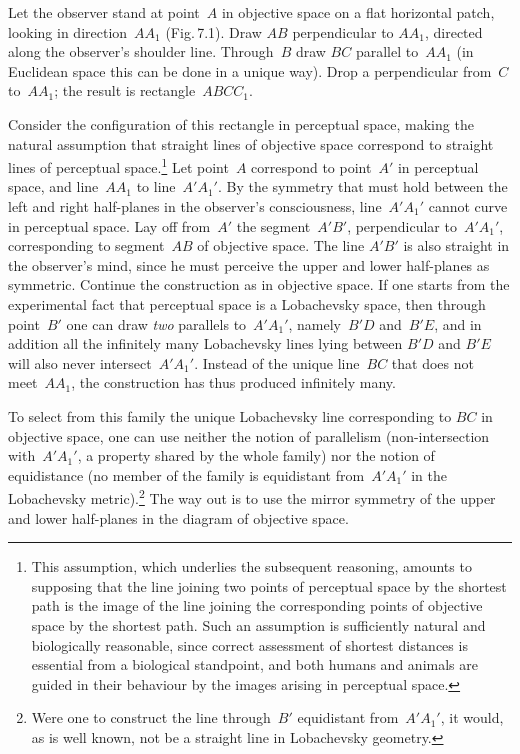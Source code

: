 Let the observer stand at point~$A$ in objective space on a flat horizontal patch, looking
in direction~$AA_1$ (Fig.\,7.1).  Draw $AB$ perpendicular to $AA_1$, directed along the
observer's shoulder line.  Through~$B$ draw $BC$ parallel to~$AA_1$ (in Euclidean space
this can be done in a unique way).  Drop a perpendicular from~$C$ to~$AA_1$; the result is
rectangle~$ABCC_1$.

Consider the configuration of this rectangle in perceptual space, making the natural
assumption that straight lines of objective space correspond to straight lines of perceptual
space.\footnote{This assumption, which underlies the subsequent reasoning, amounts to
  supposing that the line joining two points of perceptual space by the shortest path is
  the image of the line joining the corresponding points of objective space by the shortest
  path.  Such an assumption is sufficiently natural and biologically reasonable, since
  correct assessment of shortest distances is essential from a biological standpoint, and
  both humans and animals are guided in their behaviour by the images arising in perceptual
  space.}
Let point~$A$ correspond to point~$A'$ in perceptual space, and line~$AA_1$ to
line~$A'A_1'$.  By the symmetry that must hold between the left and right half-planes in
the observer's consciousness, line~$A'A_1'$ cannot curve in perceptual space.  Lay off
from~$A'$ the segment~$A'B'$, perpendicular to~$A'A_1'$, corresponding to segment~$AB$ of
objective space.  The line $A'B'$ is also straight in the observer's mind, since he must
perceive the upper and lower half-planes as symmetric.  Continue the construction as in
objective space.  If one starts from the experimental fact that perceptual space is a
Lobachevsky space, then through point~$B'$ one can draw \emph{two} parallels to~$A'A_1'$,
namely~$B'D$ and~$B'E$, and in addition all the infinitely many Lobachevsky lines lying
between $B'D$ and $B'E$ will also never intersect~$A'A_1'$.  Instead of the unique
line~$BC$ that does not meet~$AA_1$, the construction has thus produced infinitely many.


To select from this family the unique Lobachevsky line corresponding to $BC$ in objective
space, one can use neither the notion of parallelism (non-intersection with~$A'A_1'$, a
property shared by the whole family) nor the notion of equidistance (no member of the
family is equidistant from~$A'A_1'$ in the Lobachevsky metric).\footnote{Were one to
  construct the line through~$B'$ equidistant from~$A'A_1'$, it would, as is well known,
  not be a straight line in Lobachevsky geometry.}  The way out is to use the mirror
symmetry of the upper and lower half-planes in the diagram of objective space.

